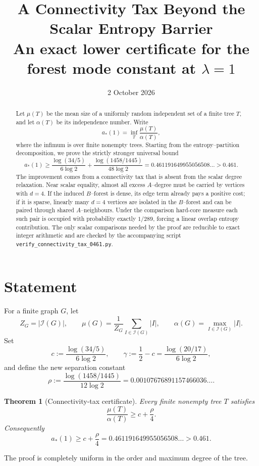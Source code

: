 \documentclass[11pt]{article}
\title{A Connectivity Tax Beyond the Scalar Entropy Barrier\\
\large An exact lower certificate for the forest mode constant at $\lambda=1$}
\author{}
\date{2 October 2026}
\newtheorem{theorem}{Theorem}
\newcommand{\Ical}{\mathcal I}
\begin{document}
\maketitle

\begin{abstract}
Let $\mu(T)$ be the mean size of a uniformly random independent set of a finite tree $T$, and let $\alpha(T)$ be its independence number.  Write
\[
 a_*(1)=\inf_T \frac{\mu(T)}{\alpha(T)},
\]
where the infimum is over finite nonempty trees.  Starting from the entropy--partition decomposition, we prove the strictly stronger universal bound
\[
\boxed{
 a_*(1)\ge
 \frac{\log(34/5)}{6\log 2}
 +\frac{\log(1458/1445)}{48\log 2}
 =0.461191649955056508\ldots>0.461 .
}
\]
The improvement comes from a connectivity tax that is absent from the scalar degree relaxation.  Near scalar equality, almost all excess $A$--degree must be carried by vertices with $d=4$.  If the induced $B$--forest is dense, its edge term already pays a positive cost; if it is sparse, linearly many $d=4$ vertices are isolated in the $B$--forest and can be paired through shared $A$--neighbours.  Under the comparison hard-core measure each such pair is occupied with probability exactly $1/289$, forcing a linear overlap entropy contribution.  The only scalar comparisons needed by the proof are reducible to exact integer arithmetic and are checked by the accompanying script \texttt{verify\_connectivity\_tax\_0461.py}.
\end{abstract}

\section{Statement}

For a finite graph $G$, let
\[
 Z_G=|\Ical(G)|,
 \qquad
 \mu(G)=\frac1{Z_G}\sum_{I\in\Ical(G)}|I|,
 \qquad
 \alpha(G)=\max_{I\in\Ical(G)}|I|.
\]
Set
\[
 c:=\frac{\log(34/5)}{6\log2},
 \qquad
 \gamma:=\frac12-c
 =\frac{\log(20/17)}{6\log2},
\]
and define the new separation constant
\[
 \rho:=\frac{\log(1458/1445)}{12\log2}
 =0.00107676891157466036\ldots .
\]

\begin{theorem}[Connectivity-tax certificate]\label{thm:main}
Every finite nonempty tree $T$ satisfies
\[
 \frac{\mu(T)}{\alpha(T)}
 \ge c+\frac{\rho}{4}.
\]
Consequently
\[
 \boxed{
 a_*(1)\ge c+\frac{\rho}{4}
 =0.461191649955056508\ldots>0.461 .
 }
\]
\end{theorem}

The proof is completely uniform in the order and maximum degree of the tree.
\end{document}
